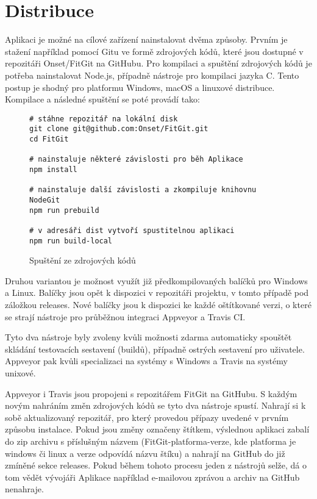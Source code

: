 \chapter{Distribuce}

Aplikaci je možné na cílové zařízení nainstalovat dvěma způsoby. Prvním je stažení například pomocí Gitu ve formě zdrojových kódů, které jsou dostupné v repozitáři Onset/FitGit na GitHubu. Pro kompilaci a spuštění zdrojových kódů je potřeba nainstalovat Node.js, případně nástroje pro kompilaci jazyka C. Tento postup je shodný pro platformu Windows, macOS a linuxové distribuce. Kompilace a následné spuštění se poté provádí tako:

\FloatBarrier
\begin{figure}[h]
	\begin{verbatim}
# stáhne repozitář na lokální disk
git clone git@github.com:Onset/FitGit.git
cd FitGit

# nainstaluje některé závislosti pro běh Aplikace
npm install

# nainstaluje další závislosti a zkompiluje knihovnu NodeGit
npm run prebuild

# v adresáři dist vytvoří spustitelnou aplikaci
npm run build-local
	\end{verbatim}
	\caption{Spuštění ze zdrojových kódů}
\end{figure}
\FloatBarrier

Druhou variantou je možnost využít již předkompilovaných balíčků pro Windows a Linux. Balíčky jsou opět k dispozici v repozitáři projektu, v tomto případě pod záložkou releases. Nové balíčky jsou k dispozici ke každé oštítkované verzi, o které se strají nástroje pro průběžnou integraci Appveyor a Travis CI.

Tyto dva nástroje byly zvoleny kvůli možnosti zdarma automaticky spouštět skládání testovacích sestavení (buildů), případně ostrých sestavení pro uživatele. Appveyor pak kvůli specializaci na systémy s Windows a Travis na systémy unixové.

Appveyor i Travis jsou propojeni s repozitářem FitGit na GitHubu. S každým novým nahráním změn zdrojových kódů se tyto dva nástroje spustí. Nahrají si k sobě aktualizovaný repozitář, pro který provedou přípazy uvedené v prvním způsobu instalace. Pokud jsou změny označeny štítkem, výslednou aplikaci zabalí do zip archivu s příslušným názvem (FitGit-platforma-verze, kde platforma je windows či linux a verze odpovídá názvu štíku) a nahrají na GitHub do již zmíněné sekce releases. Pokud během tohoto procesu jeden z nástrojů selže, dá o tom vědět vývojáři Aplikace například e-mailovou zprávou a archiv na GitHub nenahraje.

